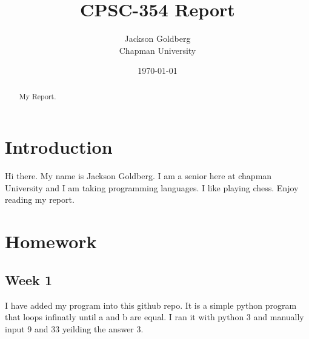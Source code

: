 \documentclass{article}
\title{CPSC-354 Report}
\author{Jackson Goldberg  \\ Chapman University}
\date{\today}
\theoremstyle{theorem}
\theoremstyle{definition}
\theoremstyle{remark}
\begin{document}
\maketitle

\begin{abstract}
My Report.  
\end{abstract}

\tableofcontents

\section{Introduction}\label{intro}
Hi there. My name is Jackson Goldberg. I am a senior here at chapman University and I am taking programming languages. I like playing chess. Enjoy reading my report.

\section{Homework}\label{homework}

\subsection{Week 1}

I have added my program into this github repo. It is a simple python program that loops infinatly until a and b are equal.
I ran it with python 3 and manually input 9 and 33 yeilding the answer 3.
\end{document}
